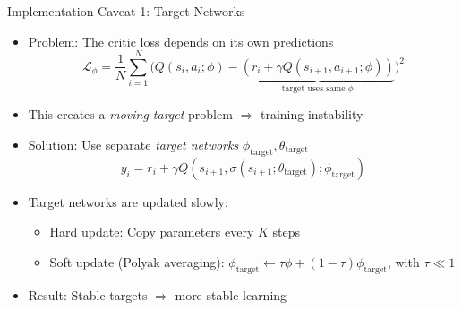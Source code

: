 \documentclass[aspectratio=169]{beamer}
\newcommand{\1}{\mathbf{1}}
\begin{document}
\begin{frame}{Implementation Caveat 1: Target Networks}
    \small
    \begin{itemize}
        \item Problem: The critic loss depends on its own predictions
        \[
            \mathcal{L}_\phi = \frac{1}{N}\sum_{i=1}^{N}
            \big( Q(s_i,a_i;\phi) - \underbrace{(r_i + \gamma Q(s_{i+1}, a_{i+1};\phi))}_{\text{target uses same } \phi} \big)^2
        \]
        \item This creates a \emph{moving target} problem $\Rightarrow$ training instability
        
        \item Solution: Use separate \emph{target networks} $\phi_{\text{target}}, \theta_{\text{target}}$
        \[
            y_i = r_i + \gamma Q(s_{i+1}, \sigma(s_{i+1};\theta_{\text{target}}); \phi_{\text{target}})
        \]
        
        \item Target networks are updated slowly:
        \begin{itemize}
            \item Hard update: Copy parameters every $K$ steps
            \item Soft update (Polyak averaging): $\phi_{\text{target}} \leftarrow \tau \phi + (1-\tau)\phi_{\text{target}}$, with $\tau \ll 1$
        \end{itemize}
        
        \item Result: Stable targets $\Rightarrow$ more stable learning
    \end{itemize}
\end{frame}
\end{document}
